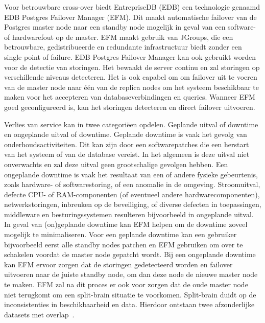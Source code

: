 Voor betrouwbare cross-over biedt EntrepriseDB (EDB) een technologie genaamd EDB Postgres Failover Manager (EFM). Dit maakt automatische failover van de Postgres master node naar een standby node mogelijk in geval van een software- of hardwarefout op de master. EFM maakt gebruik van JGroups, die een betrouwbare, gedistribueerde en redundante infrastructuur biedt zonder een single point of failure.
EDB Postgres Failover Manager kan ook gebruikt worden voor de detectie van storingen. Het bewaakt de server continu en zal storingen op verschillende niveaus detecteren. Het is ook capabel om om failover uit te voeren van de master node naar één van de replica nodes om het systeem beschikbaar te maken voor het accepteren van databaseverbindingen en queries. Wanneer EFM goed geconfigureerd is, kan het storingen detecteren en direct failover uitvoeren.

Verlies van service kan in twee categoriëen opdelen. Geplande uitval of downtime en ongeplande uitval of downtime.
Geplande downtime is vaak het gevolg van onderhoudsactiviteiten. Dit kan zijn door een softwarepatches die een herstart van het systeem of van de database vereist. In het algemeen is deze uitval niet onverwachts en zal deze uitval geen grootschalige gevolgen hebben.
Een ongeplande downtime is vaak het resultaat van een of andere fysieke gebeurtenis, zoals hardware- of softwarestoring, of een anomalie in de omgeving. Stroomuitval, defecte CPU- of RAM-componenten (of eventueel andere hardwarecomponenten), netwerkstoringen, inbreuken op de beveiliging, of diverse defecten in toepassingen, middleware en besturingssystemen resulteren bijvoorbeeld in ongeplande uitval.
In geval van (on)geplande downtime kan EFM helpen om de downtime zoveel mogelijk te minimaliseren. Voor een geplande downtime kan een gebruiker bijvoorbeeld eerst alle standby nodes patchen en EFM gebruiken om over te schakelen voordat de master node gepatcht wordt. Bij een ongeplande downtime kan EFM ervoor zorgen dat de storingen gedetecteerd worden en failover uitvoeren naar de juiste standby node, om dan deze node de nieuwe master node te maken. EFM zal na dit proces er ook voor zorgen dat de oude master node niet terugkomt om een split-brain situatie te voorkomen. Split-brain duidt op de inconsistenties in beschikbaarheid en data. Hierdoor ontstaan twee afzonderlijke datasets met overlap~\autocite{Kumar2020}. %





